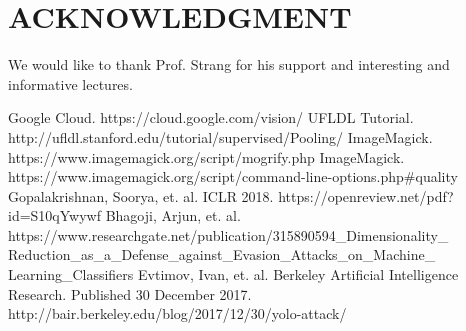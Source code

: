 \documentclass[letterpaper, 10 pt, conference]{ieeeconf}  %
\begin{document}

\section*{ACKNOWLEDGMENT}

We would like to thank Prof. Strang for his support and interesting and informative lectures.

\begin{thebibliography}{99}

  Google Cloud. https://cloud.google.com/vision/
  UFLDL Tutorial. http://ufldl.stanford.edu/tutorial/supervised/Pooling/
  ImageMagick. https://www.imagemagick.org/script/mogrify.php
  ImageMagick. https://www.imagemagick.org/script/command-line-options.php\#quality
 Gopalakrishnan, Soorya, et. al.  ICLR 2018. https://openreview.net/pdf?id=S10qYwywf
 Bhagoji, Arjun, et. al.  https://www.researchgate.net/publication/315890594\_Dimensionality\_ Reduction\_as\_a\_Defense\_against\_Evasion\_Attacks\_on\_Machine\_ Learning\_Classifiers
 Evtimov, Ivan, et. al.  Berkeley Artificial Intelligence Research. Published 30 December 2017. http://bair.berkeley.edu/blog/2017/12/30/yolo-attack/

\end{thebibliography}
\end{document}
